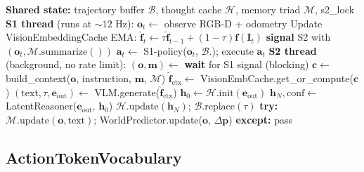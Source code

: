 \documentclass[10pt,twocolumn,letterpaper]{article}
\begin{document}
\begin{algorithm}[t]
\small
\caption{NexusNav-V3 Dual-System Async Protocol}
\label{alg:dual_system}
\begin{algorithmic}[1]
\STATE \textbf{Shared state:} trajectory buffer $\mathcal{B}$, thought cache $\mathcal{H}$, memory triad $\mathcal{M}$, s2\_lock
\STATE \textbf{S1 thread} (runs at ${\sim}12$ Hz):
  \STATE $\mathbf{o}_t \leftarrow$ observe RGB-D + odometry
  \STATE Update VisionEmbeddingCache EMA: $\hat{\mathbf{f}}_t \leftarrow \tau\hat{\mathbf{f}}_{t-1} + (1-\tau)\mathbf{f}(\mathbf{I}_t)$
    \STATE \textbf{signal} S2 with $(\mathbf{o}_t, \mathcal{M}.\text{summarize}())$ 
  \ENDIF
  \STATE $\mathbf{a}_t \leftarrow$ S1-policy($\mathbf{o}_t$, $\mathcal{B}$.); execute $\mathbf{a}_t$
\ENDWHILE
\STATE
\STATE \textbf{S2 thread} (background, no rate limit):
  \STATE $(\mathbf{o}, \mathbf{m}) \leftarrow$ \textbf{wait} for S1 signal (blocking)
  \STATE $\mathbf{c} \leftarrow$ build\_context($\mathbf{o}$, instruction, $\mathbf{m}$, $\mathcal{M}$)
  \STATE $\hat{\mathbf{f}}_{\text{ctx}} \leftarrow$ VisionEmbCache.get\_or\_compute($\mathbf{c}$) 
  \STATE $(\text{text}, \tau, \mathbf{e}_{\text{out}}) \leftarrow$ VLM.generate($\hat{\mathbf{f}}_{\text{ctx}}$) 
  \STATE $\mathbf{h}_0 \leftarrow \mathcal{H}.\text{init}(\mathbf{e}_{\text{out}})$ 
  \STATE $\mathbf{h}_N, \text{conf} \leftarrow$ LatentReasoner($\mathbf{e}_{\text{out}}$, $\mathbf{h}_0$) 
  \STATE $\mathcal{H}.\text{update}(\mathbf{h}_N)$; $\mathcal{B}.\text{replace}(\tau)$ 
  \STATE \textbf{try:} $\mathcal{M}.\text{update}(\mathbf{o}, \text{text})$; WorldPredictor.update($\mathbf{o}$, $\Delta\mathbf{p}$)
  \STATE \textbf{except:} pass 
\ENDWHILE
\end{algorithmic}
\end{algorithm}

\subsection{ActionTokenVocabulary}
\label{sec:action_tokens}
\end{document}
